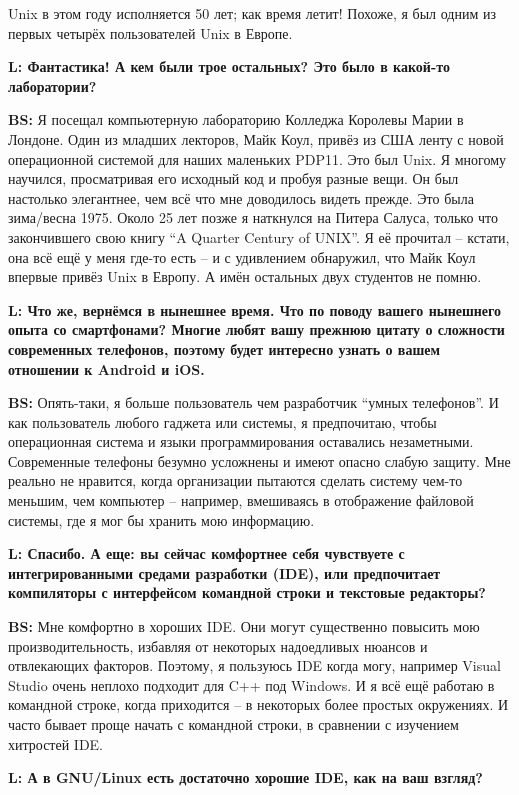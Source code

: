 \documentclass[10pt, a5paper]{article}
\begin{document}
\begin{Parallel}[p]{}{}
{Unix в этом году исполняется 50 лет; как время летит! Похоже, я был одним из первых четырёх пользователей Unix в Европе.

{\noindent \bf L: Фантастика! А кем были трое остальных? Это было в какой-то лаборатории? }

{\noindent \bf BS:} Я посещал компьютерную лабораторию Колледжа Королевы Марии в Лондоне. Один из младших лекторов, Майк Коул, привёз из США ленту с новой операционной системой для наших маленьких PDP11. Это был Unix. Я многому научился, просматривая его исходный код и пробуя разные вещи. Он был настолько элегантнее, чем всё что мне доводилось видеть прежде. Это была зима/весна 1975. Около 25 лет позже я наткнулся на Питера Салуса, только что закончившего свою книгу “A Quarter Century of UNIX”. Я её прочитал – кстати, она всё ещё у меня где-то есть – и с удивлением обнаружил, что Майк Коул впервые привёз Unix в Европу. А имён остальных двух студентов не помню.

{\noindent \bf L: Что же, вернёмся в нынешнее время. Что по поводу вашего нынешнего опыта со смартфонами? Многие любят вашу прежнюю цитату о сложности современных телефонов, поэтому будет интересно узнать о вашем отношении к  Android и iOS.}

{\noindent \bf BS:} Опять-таки, я больше пользователь чем разработчик ``умных телефонов''. И как пользователь любого гаджета или системы, я предпочитаю, чтобы операционная система и языки программирования оставались незаметными. Современные телефоны безумно усложнены и имеют опасно слабую защиту. Мне реально не нравится, когда организации пытаются сделать систему чем-то меньшим, чем компьютер -- например, вмешиваясь в отображение файловой системы, где я мог бы хранить мою информацию.

{\noindent \bf L: Спасибо. А еще: вы сейчас комфортнее себя чувствуете с интегрированными средами разработки (IDE), или предпочитает компиляторы с интерфейсом командной строки и текстовые редакторы?}

{\noindent \bf BS:} Мне комфортно в хороших IDE. Они могут существенно повысить мою производительность, избавляя от некоторых надоедливых нюансов и отвлекающих факторов. Поэтому, я пользуюсь IDE когда могу, например Visual Studio очень неплохо подходит для C++ под Windows. И я всё ещё работаю в командной строке, когда приходится – в некоторых более простых окружениях. И часто бывает проще начать с командной строки, в сравнении с изучением хитростей IDE. 

{\noindent \bf L: А в GNU/Linux есть достаточно хорошие IDE, как на ваш взгляд?}

}
\end{Parallel}
\end{document}
